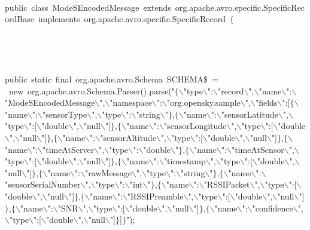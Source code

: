 {
\tt
{public\ class\ ModeSEncodedMessage\ extends\ org.apache.avro.specific.SpecificRecordBase\ implements\ org.apache.avro.specific.SpecificRecord\ $\{$\leavevmode\par
{\ }}{\hlstd\ \ }{\hlstd public\ static\ final\ org.apache.avro.Schema\ SCHEMA\${}\ $\mathord{=}$\ new\ org.apache.avro.Schema.Parser().parse("$\{$$\backslash$"type$\backslash$":$\backslash$"record$\backslash$",$\backslash$"name$\backslash$":$\backslash$"ModeSEncodedMessage$\backslash$",$\backslash$"namespace$\backslash$":$\backslash$"org.opensky.sample$\backslash$",$\backslash$"fields$\backslash$":[$\{$$\backslash$"name$\backslash$":$\backslash$"sensorType$\backslash$",$\backslash$"type$\backslash$":$\backslash$"string$\backslash$"$\}$,$\{$$\backslash$"name$\backslash$":$\backslash$"sensorLatitude$\backslash$",$\backslash$"type$\backslash$":[$\backslash$"double$\backslash$",$\backslash$"null$\backslash$"]$\}$,$\{$$\backslash$"name$\backslash$":$\backslash$"sensorLongitude$\backslash$",$\backslash$"type$\backslash$":[$\backslash$"double$\backslash$",$\backslash$"null$\backslash$"]$\}$,$\{$$\backslash$"name$\backslash$":$\backslash$"sensorAltitude$\backslash$",$\backslash$"type$\backslash$":[$\backslash$"double$\backslash$",$\backslash$"null$\backslash$"]$\}$,$\{$$\backslash$"name$\backslash$":$\backslash$"timeAtServer$\backslash$",$\backslash$"type$\backslash$":$\backslash$"double$\backslash$"$\}$,$\{$$\backslash$"name$\backslash$":$\backslash$"timeAtSensor$\backslash$",$\backslash$"type$\backslash$":[$\backslash$"double$\backslash$",$\backslash$"null$\backslash$"]$\}$,$\{$$\backslash$"name$\backslash$":$\backslash$"timestamp$\backslash$",$\backslash$"type$\backslash$":[$\backslash$"double$\backslash$",$\backslash$"null$\backslash$"]$\}$,$\{$$\backslash$"name$\backslash$":$\backslash$"rawMessage$\backslash$",$\backslash$"type$\backslash$":$\backslash$"string$\backslash$"$\}$,$\{$$\backslash$"name$\backslash$":$\backslash$"sensorSerialNumber$\backslash$",$\backslash$"type$\backslash$":$\backslash$"int$\backslash$"$\}$,$\{$$\backslash$"name$\backslash$":$\backslash$"RSSIPacket$\backslash$",$\backslash$"type$\backslash$":[$\backslash$"double$\backslash$",$\backslash$"null$\backslash$"]$\}$,$\{$$\backslash$"name$\backslash$":$\backslash$"RSSIPreamble$\backslash$",$\backslash$"type$\backslash$":[$\backslash$"double$\backslash$",$\backslash$"null$\backslash$"]$\}$,$\{$$\backslash$"name$\backslash$":$\backslash$"SNR$\backslash$",$\backslash$"type$\backslash$":[$\backslash$"double$\backslash$",$\backslash$"null$\backslash$"]$\}$,$\{$$\backslash$"name$\backslash$":$\backslash$"confidence$\backslash$",$\backslash$"type$\backslash$":[$\backslash$"double$\backslash$",$\backslash$"null$\backslash$"]$\}$]$\}$");\leavevmode\par
}}
